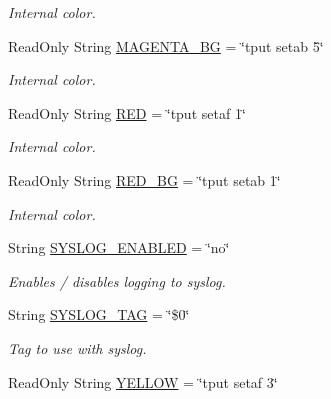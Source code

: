 \begin{DoxyCompactItemize}
\begin{DoxyCompactList}\small\item\em Internal color. \end{DoxyCompactList}\item 
\mbox{\label{bsfl_8sh_a675314fe5657eecfcb21481bca7f041d}} 
Read\+Only String \hyperlink{bsfl_8sh_a675314fe5657eecfcb21481bca7f041d}{M\+A\+G\+E\+N\+T\+A\+\_\+\+BG} = \char`\"{}tput setab 5\char`\"{}
\begin{DoxyCompactList}\small\item\em Internal color. \end{DoxyCompactList}\item 
\mbox{\label{bsfl_8sh_a2fa22bc5317cd6f6690f2528eaf84400}} 
Read\+Only String \hyperlink{bsfl_8sh_a2fa22bc5317cd6f6690f2528eaf84400}{R\+ED} = \char`\"{}tput setaf 1\char`\"{}
\begin{DoxyCompactList}\small\item\em Internal color. \end{DoxyCompactList}\item 
\mbox{\label{bsfl_8sh_a274149966a1d83ac7d061e3f828d1c16}} 
Read\+Only String \hyperlink{bsfl_8sh_a274149966a1d83ac7d061e3f828d1c16}{R\+E\+D\+\_\+\+BG} = \char`\"{}tput setab 1\char`\"{}
\begin{DoxyCompactList}\small\item\em Internal color. \end{DoxyCompactList}\item 
String \hyperlink{bsfl_8sh_a8156ebc13563ddc7be6b5fb214e861cf}{S\+Y\+S\+L\+O\+G\+\_\+\+E\+N\+A\+B\+L\+ED} = \char`\"{}no\char`\"{}
\begin{DoxyCompactList}\small\item\em Enables / disables logging to syslog. \end{DoxyCompactList}\item 
String \hyperlink{bsfl_8sh_aeb08842be9710b858b9e92f078a117a2}{S\+Y\+S\+L\+O\+G\+\_\+\+T\+AG} = \char`\"{}\$0\char`\"{}
\begin{DoxyCompactList}\small\item\em Tag to use with syslog. \end{DoxyCompactList}\item 
\mbox{\label{bsfl_8sh_acc0f8b95413215f98df66ebfdebceb5b}} 
Read\+Only String \hyperlink{bsfl_8sh_acc0f8b95413215f98df66ebfdebceb5b}{Y\+E\+L\+L\+OW} = \char`\"{}tput setaf 3\char`\"{}

\end{DoxyCompactItemize}
